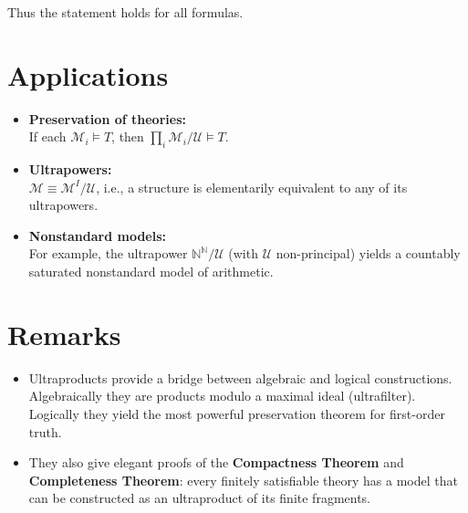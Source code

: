 \documentclass[
]{article}
\theoremstyle{definition}
\theoremstyle{plain}
\theoremstyle{plain}
\theoremstyle{remark}
\begin{document}
Thus the statement holds for all formulas.

\section{Applications}\label{applications}

\begin{itemize}
\item
  \textbf{Preservation of theories:}\\
  If each \(\mathcal{M}_i \models T\), then
  \(\prod_i \mathcal{M}_i / \mathcal{U} \models T\).
\item
  \textbf{Ultrapowers:}\\
  \(\mathcal{M} \equiv \mathcal{M}^I / \mathcal{U}\), i.e., a structure
  is elementarily equivalent to any of its ultrapowers.
\item
  \textbf{Nonstandard models:}\\
  For example, the ultrapower \(\mathbb{N}^\mathbb{N}/\mathcal{U}\)
  (with \(\mathcal{U}\) non-principal) yields a countably saturated
  nonstandard model of arithmetic.
\end{itemize}

\section{Remarks}\label{remarks}

\begin{itemize}
\item
  Ultraproducts provide a bridge between algebraic and logical
  constructions.\\
  Algebraically they are products modulo a maximal ideal
  (ultrafilter).\\
  Logically they yield the most powerful preservation theorem for
  first-order truth.
\item
  They also give elegant proofs of the \textbf{Compactness Theorem} and
  \textbf{Completeness Theorem}: every finitely satisfiable theory has a
  model that can be constructed as an ultraproduct of its finite
  fragments.
\end{itemize}
\end{document}
